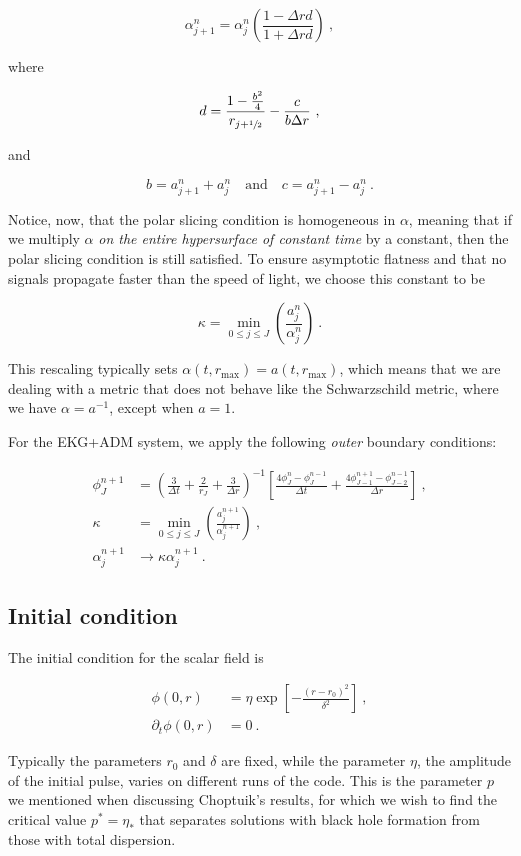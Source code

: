 \documentclass[a4paper,11pt]{article}
\renewcommand{\a}{\alpha}
\renewcommand{\d}{\delta}
\newcommand{\pd}{\partial}
\newcommand{\nn}{\nonumber}
\newcommand{\dt}{\Delta t}
\newcommand{\dr}{\Delta r}
\newcommand{\lrpar}[1]{\left( #1 \right)}
\newcommand{\lrsquare}[1]{\left[ #1 \right]}
\newcommand{\n}{\noindent}
\newcommand{\eq}[1]{
  \begin{equation}
    #1
  \end{equation}
}
\newcommand{\spl}[1]{
  \begin{split}
    #1
  \end{split}
}
\newcommand{\al}[1]{
  \begin{align}
    #1
  \end{align}
}
\renewcommand{\parbox}[2]{

  \vspace*{0.25in}
  
  \begin{tcolorbox}[title=Box #1,colback=blue!5!white,colframe=gray!75!black]
    #2
  \end{tcolorbox}

  \vspace*{0.25in}

}
\begin{document}
\eq{ \a^{n}_{j+1} = \a^{n}_{j}\lrpar{\frac{1-\dr d}{1+\dr d}} \ ,}

\n where

\eq{ d = \frac{1 - \frac{b^{2}}{4}}{r_{j+\sfrac{1}{2}}} - \frac{c}{b\dr}\ ,}

\n and

\eq{ b = a^{n}_{j+1} + a^{n}_{j}\quad \text{and}\quad c = a^{n}_{j+1} - a^{n}_{j}\ .}

Notice, now, that the polar slicing condition is homogeneous in $\a$, meaning that if we multiply $\a$ \emph{on the entire hypersurface of constant time} by a constant, then the polar slicing condition is still satisfied. To ensure asymptotic flatness and that no signals propagate faster than the speed of light, we choose this constant to be

\eq{ \kappa = \min_{0\leq j\leq J}\lrpar{\frac{a^{n}_{j}}{\a^{n}_{j}}}\ . }

\n This rescaling typically sets $\a(t,r_{\max}) = a(t,r_{\max})$, which means that we are dealing with a metric that does not behave like the Schwarzschild metric, where we have $\a = a^{-1}$, except when $a=1$.

\parbox{5: EKG+ADM -- Outer boundary conditions}{
  For the EKG+ADM system, we apply the following \emph{outer} boundary conditions:
  \al{
    \phi^{n+1}_{J} &= \lrpar{\frac{3}{\dt} + \frac{2}{r_{J}} + \frac{3}{\dr}}^{-1}\lrsquare{\frac{4\phi^{n}_{J} - \phi^{n-1}_{J}}{\dt} + \frac{4\phi^{n+1}_{J-1} - \phi^{n-1}_{J-2}}{\dr}}\ ,\nn\\
    \kappa &= \min_{0\leq j\leq J}\lrpar{\frac{a^{n+1}_{j}}{\a^{n+1}_{j}}}\ ,\nn\\
    \a^{n+1}_{j} &\to \kappa\a^{n+1}_{j}\ .\nn
  }
}

\subsection{Initial condition}

The initial condition for the scalar field is

\eq{
  \spl{
    \phi(0,r) &= \eta\exp\lrsquare{-\frac{\lrpar{r-r_{0}}^{2}}{\d^{2}}}\ ,\\
    \pd_{t}\phi(0,r) &= 0\ .
  }
  \label{eq:initial_condition_1}
}

\n Typically the parameters $r_{0}$ and $\d$ are fixed, while the parameter $\eta$, the amplitude of the initial pulse, varies on different runs of the code. This is the parameter $p$ we mentioned when discussing Choptuik's results, for which we wish to find the critical value $p^{*}=\eta_{*}$ that separates solutions with black hole formation from those with total dispersion.
\end{document}
